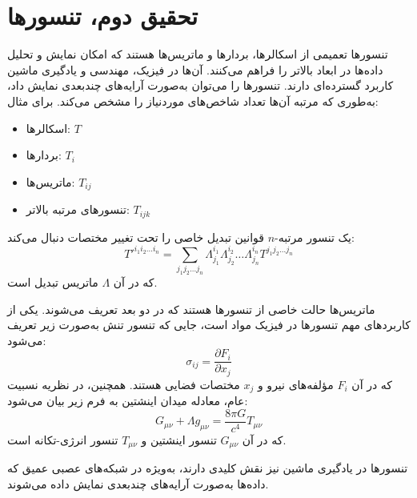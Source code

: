
\chapter*{تحقیق دوم، تنسورها}

تنسورها تعمیمی از اسکالرها، بردارها و ماتریس‌ها هستند که امکان نمایش و تحلیل داده‌ها در ابعاد بالاتر را فراهم می‌کنند. آن‌ها در فیزیک، مهندسی و یادگیری ماشین کاربرد گسترده‌ای دارند. تنسورها را می‌توان به‌صورت آرایه‌های چندبعدی نمایش داد، به‌طوری که مرتبه آن‌ها تعداد شاخص‌های موردنیاز را مشخص می‌کند. برای مثال:
\begin{itemize}
	\item اسکالرها: $T$
	\item بردارها: $T_i$
	\item ماتریس‌ها: $T_{ij}$
	\item تنسورهای مرتبه بالاتر: $T_{ijk}$
\end{itemize}
یک تنسور مرتبه-$n$ قوانین تبدیل خاصی را تحت تغییر مختصات دنبال می‌کند:
\begin{equation}
	T'^{i_1 i_2 \dots i_n} = \sum_{j_1 j_2 \dots j_n} \Lambda^{i_1}_{j_1} \Lambda^{i_2}_{j_2} \dots \Lambda^{i_n}_{j_n} T^{j_1 j_2 \dots j_n}
\end{equation}
که در آن $\Lambda$ ماتریس تبدیل است.

ماتریس‌ها حالت خاصی از تنسورها هستند که در دو بعد تعریف می‌شوند. 
یکی از کاربردهای مهم تنسورها در فیزیک مواد است، جایی که تنسور تنش به‌صورت زیر تعریف می‌شود:
\begin{equation}
	\sigma_{ij} = \frac{\partial F_i}{\partial x_j}
\end{equation}
که در آن $F_i$ مؤلفه‌های نیرو و $x_j$ مختصات فضایی هستند. همچنین، در نظریه نسبیت عام، معادله میدان اینشتین به فرم زیر بیان می‌شود:
\begin{equation}
	G_{\mu\nu} + \Lambda g_{\mu\nu} = \frac{8\pi G}{c^4} T_{\mu\nu}
\end{equation}
که در آن $G_{\mu\nu}$ تنسور اینشتین و $T_{\mu\nu}$ تنسور انرژی-تکانه است.

تنسورها در یادگیری ماشین نیز نقش کلیدی دارند، به‌ویژه در شبکه‌های عصبی عمیق که داده‌ها به‌صورت آرایه‌های چندبعدی نمایش داده می‌شوند.



